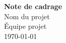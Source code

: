 \documentclass[a4paper,12pt]{article}
\begin{document}
\begin{titlepage}
    \centering
    {\Huge \textbf{Note de cadrage}} \\[1.5cm]
    {\Large Nom du projet} \\[2cm]
    {\large Équipe projet} \\[1cm]
    \vfill
    {\large \today}
\end{titlepage}

\tableofcontents
\newpage


\end{document}
